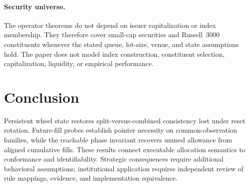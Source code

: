 \documentclass[11pt]{article}
\theoremstyle{definition}
\theoremstyle{remark}
\begin{document}
\paragraph{Security universe.} The operator theorems do not depend on issuer capitalization or index membership. They therefore cover small-cap securities and Russell~3000 constituents whenever the stated queue, lot-size, venue, and state assumptions hold. The paper does not model index construction, constituent selection, capitalization, liquidity, or empirical performance.

\section{Conclusion}\label{sec:programme}

Persistent wheel state restores split-versus-combined consistency lost under reset rotation. Future-fill probes establish pointer necessity on common-observation families, while the reachable phase invariant recovers unused allowance from aligned cumulative fills. These results connect executable allocation semantics to conformance and identifiability. Strategic consequences require additional behavioral assumptions; institutional application requires independent review of rule mappings, evidence, and implementation equivalence.

\appendix
\end{document}
